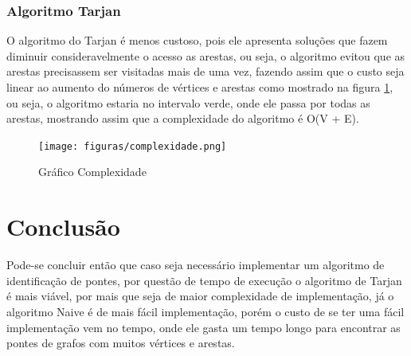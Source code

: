 \subsubsection{Algoritmo Tarjan}
O algoritmo do Tarjan é menos custoso, pois ele apresenta soluções que fazem diminuir consideravelmente o acesso as arestas, ou seja, o algoritmo evitou que as arestas precisassem ser visitadas mais de uma vez, fazendo assim que o custo seja linear ao aumento do números de vértices e arestas como mostrado na figura \ref{fig:figure7}, ou seja, o algoritmo estaria no intervalo verde, onde ele passa por todas as arestas, mostrando assim que a complexidade do algoritmo é O(V + E).

\newpage

\begin{figure}[ht]
    \centering
    \texttt{[image: figuras/complexidade.png]}
    \caption{Gráfico Complexidade}
    \label{fig:figure7}
\end{figure}

\section{\esp Conclusão}
Pode-se concluir então que caso seja necessário implementar um algoritmo de identificação de pontes, por questão de tempo de execução o algoritmo de Tarjan é mais viável, por mais que seja de maior complexidade de implementação, já o algoritmo Naive é de mais fácil implementação, porém o custo de se ter uma fácil implementação vem no tempo, onde ele gasta um tempo longo para encontrar as pontes de grafos com muitos vértices e arestas.
